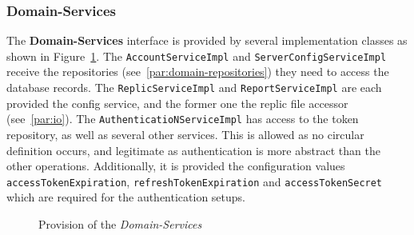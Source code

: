 \subsubsection{Domain-Services}
The \textbf{Domain-Services} interface is provided by several implementation classes as shown in Figure~\ref{fig:domain-services-p}. \newline
The \texttt{AccountServiceImpl} and \texttt{ServerConfigServiceImpl} receive the repositories (see~\ref{par:domain-repositories}) they need to access the database records. \newline
The \texttt{ReplicServiceImpl} and \texttt{ReportServiceImpl} are each provided the config service, and the former one the replic file accessor (see~\ref{par:io}). \newline
The \texttt{AuthenticatioNServiceImpl} has access to the token repository, as well as several other services.
This is allowed as no circular definition occurs, and legitimate as authentication is more abstract than the other operations.
Additionally, it is provided the configuration values \texttt{accessTokenExpiration}, \texttt{refreshTokenExpiration} and \texttt{accessTokenSecret} which are required for the authentication setups.

\begin{figure}
    \centering

    \caption{Provision of the \textit{Domain-Services}}
    \label{fig:domain-services-p}
\end{figure}
